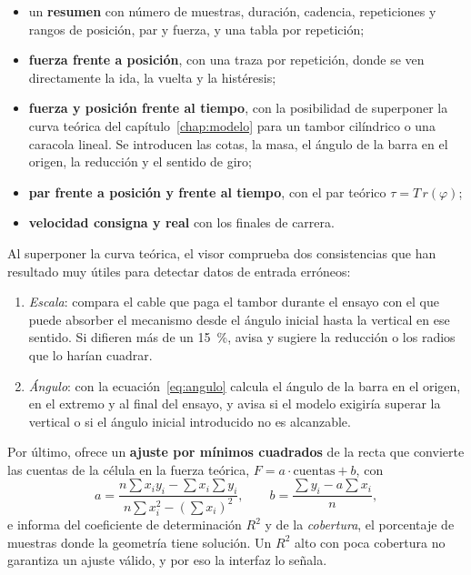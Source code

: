 \begin{itemize}
  \item un \textbf{resumen} con número de muestras, duración, cadencia, repeticiones y rangos de
        posición, par y fuerza, y una tabla por repetición;
  \item \textbf{fuerza frente a posición}, con una traza por repetición, donde se ven directamente la
        ida, la vuelta y la histéresis;
  \item \textbf{fuerza y posición frente al tiempo}, con la posibilidad de superponer la curva
        teórica del capítulo~\ref{chap:modelo} para un tambor cilíndrico o una caracola lineal. Se
        introducen las cotas, la masa, el ángulo de la barra en el origen, la reducción y el sentido
        de giro;
  \item \textbf{par frente a posición y frente al tiempo}, con el par teórico $\tau = T\,r(\varphi)$;
  \item \textbf{velocidad consigna y real} con los finales de carrera.
\end{itemize}

Al superponer la curva teórica, el visor comprueba dos consistencias que han resultado muy útiles
para detectar datos de entrada erróneos:
\begin{enumerate}
  \item \emph{Escala}: compara el cable que paga el tambor durante el ensayo con el que puede absorber
        el mecanismo desde el ángulo inicial hasta la vertical en ese sentido. Si difieren más de un
        \SI{15}{\percent}, avisa y sugiere la reducción o los radios que lo harían cuadrar.
  \item \emph{Ángulo}: con la ecuación~\eqref{eq:angulo} calcula el ángulo de la barra en el origen,
        en el extremo y al final del ensayo, y avisa si el modelo exigiría superar la vertical o si el
        ángulo inicial introducido no es alcanzable.
\end{enumerate}

Por último, ofrece un \textbf{ajuste por mínimos cuadrados} de la recta que convierte las cuentas de
la célula en la fuerza teórica, $F = a\cdot\text{cuentas} + b$, con
\begin{equation}
  a = \frac{n\sum x_iy_i - \sum x_i\sum y_i}{n\sum x_i^2 - (\sum x_i)^2}, \qquad
  b = \frac{\sum y_i - a\sum x_i}{n},
\end{equation}
e informa del coeficiente de determinación $R^2$ y de la \emph{cobertura}, el porcentaje de muestras
donde la geometría tiene solución. Un $R^2$ alto con poca cobertura no garantiza un ajuste válido, y
por eso la interfaz lo señala.

